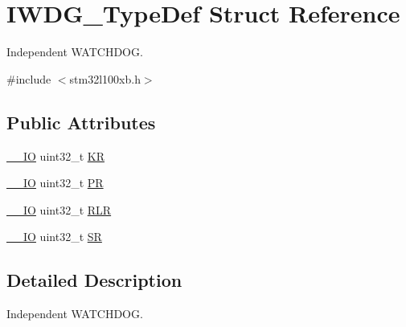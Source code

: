 \hypertarget{struct_i_w_d_g___type_def}{\section{I\-W\-D\-G\-\_\-\-Type\-Def Struct Reference}
\label{struct_i_w_d_g___type_def}
}


Independent W\-A\-T\-C\-H\-D\-O\-G.  




{\ttfamily \#include $<$stm32l100xb.\-h$>$}

\subsection*{Public Attributes}
\begin{DoxyCompactItemize}
\item 
\hyperlink{core__sc300_8h_aec43007d9998a0a0e01faede4133d6be}{\-\_\-\-\_\-\-I\-O} uint32\-\_\-t \hyperlink{struct_i_w_d_g___type_def_a63089aaa5f4ad34ee2677ebcdee49cd9}{K\-R}
\item 
\hyperlink{core__sc300_8h_aec43007d9998a0a0e01faede4133d6be}{\-\_\-\-\_\-\-I\-O} uint32\-\_\-t \hyperlink{struct_i_w_d_g___type_def_a5f2717885ff171e686e0347af9e6b68d}{P\-R}
\item 
\hyperlink{core__sc300_8h_aec43007d9998a0a0e01faede4133d6be}{\-\_\-\-\_\-\-I\-O} uint32\-\_\-t \hyperlink{struct_i_w_d_g___type_def_aa3703eaa40e447dcacc69c0827595532}{R\-L\-R}
\item 
\hyperlink{core__sc300_8h_aec43007d9998a0a0e01faede4133d6be}{\-\_\-\-\_\-\-I\-O} uint32\-\_\-t \hyperlink{struct_i_w_d_g___type_def_a9bbfbe921f2acfaf58251849bd0a511c}{S\-R}
\end{DoxyCompactItemize}


\subsection{Detailed Description}
Independent W\-A\-T\-C\-H\-D\-O\-G. 

